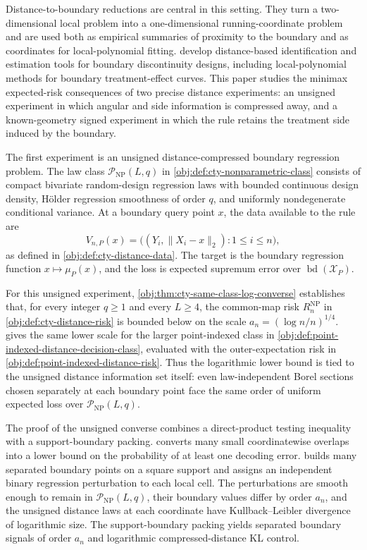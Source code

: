 Distance-to-boundary reductions are central in this setting. They turn a two-dimensional local problem into a one-dimensional running-coordinate problem and are used both as empirical summaries of proximity to the boundary and as coordinates for local-polynomial fitting. \citet{CattaneoTitiunikYu2026Distance} develop distance-based identification and estimation tools for boundary discontinuity designs, including local-polynomial methods for boundary treatment-effect curves. This paper studies the minimax expected-risk consequences of two precise distance experiments: an unsigned experiment in which angular and side information is compressed away, and a known-geometry signed experiment in which the rule retains the treatment side induced by the boundary.

The first experiment is an unsigned distance-compressed boundary regression problem. The law class \(\mathcal P_{\mathrm{NP}}(L,q)\) in \cref{obj:def:cty-nonparametric-class} consists of compact bivariate random-design regression laws with bounded continuous design density, Hölder regression smoothness of order \(q\), and uniformly nondegenerate conditional variance. At a boundary query point \(x\), the data available to the rule are
\[
V_{n,P}(x)=\bigl((Y_i,\lVert X_i-x\rVert_2):1\leq i\leq n\bigr),
\]
as defined in \cref{obj:def:cty-distance-data}. The target is the boundary regression function \(x\mapsto\mu_P(x)\), and the loss is expected supremum error over \(\operatorname{bd}(\mathcal X_P)\).

For this unsigned experiment, \cref{obj:thm:cty-same-class-log-converse} establishes that, for every integer \(q\ge1\) and every \(L\ge4\), the common-map risk \(R_n^{\mathrm{NP}}\) in \cref{obj:def:cty-distance-risk} is bounded below on the scale \(a_n=(\log n/n)^{1/4}\).  gives the same lower scale for the larger point-indexed class in \cref{obj:def:point-indexed-distance-decision-class}, evaluated with the outer-expectation risk in \cref{obj:def:point-indexed-distance-risk}. Thus the logarithmic lower bound is tied to the unsigned distance information set itself: even law-independent Borel sections chosen separately at each boundary point face the same order of uniform expected loss over \(\mathcal P_{\mathrm{NP}}(L,q)\).

The proof of the unsigned converse combines a direct-product testing inequality with a support-boundary packing.  converts many small coordinatewise overlaps into a lower bound on the probability of at least one decoding error.  builds many separated boundary points on a square support and assigns an independent binary regression perturbation to each local cell. The perturbations are smooth enough to remain in \(\mathcal P_{\mathrm{NP}}(L,q)\), their boundary values differ by order \(a_n\), and the unsigned distance laws at each coordinate have Kullback--Leibler divergence of logarithmic size. The support-boundary packing yields separated boundary signals of order \(a_n\) and logarithmic compressed-distance KL control.

